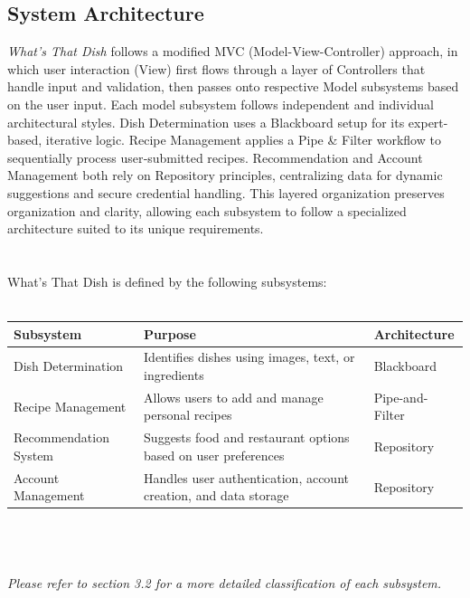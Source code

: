 \documentclass[]{article}
\begin{document}
\subsection{System Architecture}
\label{sub:system_architecture}
\textit{What’s That Dish} follows a modified MVC (Model-View-Controller) approach, in which user interaction (View) first flows through a layer of Controllers that handle input and validation, then passes onto respective Model subsystems based on the user input. 
Each model subsystem follows independent and individual architectural styles. 
Dish Determination uses a Blackboard setup for its expert-based, iterative logic. 
Recipe Management applies a Pipe \& Filter workflow to sequentially process user‐submitted recipes. 
Recommendation and Account Management both rely on Repository principles, centralizing data for dynamic suggestions and secure credential handling. 
This layered organization preserves organization and clarity, allowing each subsystem to follow a specialized architecture suited to its unique requirements.
\\
\\
\\
What’s That Dish is defined by the following subsystems: 
\\
\\
\begin{tabularx}{1.0\textwidth} { 
  | >{\centering\arraybackslash}X 
  | >{\centering\arraybackslash}X 
  | >{\centering\arraybackslash}X | }
 \hline
 \textbf{Subsystem} & \textbf{Purpose} & \textbf{Architecture} \\
 \hline
 Dish Determination  & Identifies dishes using images, text, or ingredients  & Blackboard  \\
\hline
 Recipe Management  & Allows users to add and manage personal recipes  & Pipe-and-Filter  \\
\hline
 Recommendation System  & Suggests food and restaurant options based on user preferences  & Repository  \\
\hline
 Account Management  & Handles user authentication, account creation, and data storage  & Repository  \\
\hline

\end{tabularx}
\\
\\
\\
\textit{Please refer to section 3.2 for a more detailed classification of each subsystem.}
\\
\end{document}
